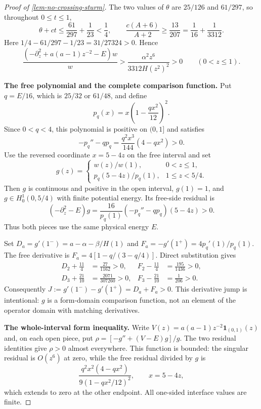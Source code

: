 \documentclass[11pt,a4paper]{article}
\theoremstyle{proofmanuscript}
\begin{document}
\begin{proof}[Proof of \ref{lem-no-crossing-sturm}]
The two values of \(\theta\) are \(25/126\) and \(61/297\), so throughout \(0\le t\le1\), \[
\theta+ct\le\frac{61}{297}+\frac1{23}<\frac14,
\qquad
\frac{c(A+6)}{A+2}\ge\frac{13}{207}
=\frac1{16}+\frac1{3312}.
\] Here \(1/4-61/297-1/23=31/27324>0\). Hence \[
\frac{(-\partial_z^2+a(a-1)z^{-2}-E)w}{w}
>\frac{\alpha^2z^6}{3312H(z^2)^2}>0
\qquad(0<z\le1).
\tag{H.6.5}
\]

\textbf{The free polynomial and the complete comparison function.} Put \(q=E/16\), which is \(25/32\) or \(61/48\), and define \[
p_q(x)=x\left(1-\frac{qx^2}{12}\right)^2.
\] Since \(0<q<4\), this polynomial is positive on \((0,1]\) and satisfies \[
-p_q''-q p_q=\frac{q^2x^3}{144}(4-qx^2)>0.
\tag{H.6.6}
\] Use the reversed coordinate \(x=5-4z\) on the free interval and set \[
g(z)=
\begin{cases}
w(z)/w(1),&0<z\le1,\\[2mm]
p_q(5-4z)/p_q(1),&1\le z<5/4.
\end{cases}
\tag{H.6.7}
\] Then \(g\) is continuous and positive in the open interval, \(g(1)=1\), and \(g\in H_0^1(0,5/4)\) with finite potential energy. Its free-side residual is \[
(-\partial_z^2-E)g
=\frac{16}{p_q(1)}(-p_q''-q p_q)(5-4z)>0.
\] Thus both pieces use the same physical energy \(E\).

Set \(D_a=g'(1^-)=a-\alpha-\beta/H(1)\) and \(F_a=-g'(1^+)=4p_q'(1)/p_q(1)\). The free derivative is \(F_a=4[1-q/(3-q/4)]\). Direct substitution gives \[
\begin{aligned}
D_2+\frac{11}{4}&=\frac{27}{1162}>0,
&F_2-\frac{11}{4}&=\frac{195}{1436}>0,\\
D_3+\frac{21}{10}&=\frac{2071}{307260}>0,
&F_3-\frac{21}{10}&=\frac1{206}>0.
\end{aligned}
\tag{H.6.8}
\] Consequently \(J:=g'(1^-)-g'(1^+)=D_a+F_a>0\). This derivative jump is intentional: \(g\) is a form-domain comparison function, not an element of the operator domain with matching derivatives.

\textbf{The whole-interval form inequality.} Write \(V(z)=a(a-1)z^{-2}\mathbf1_{(0,1)}(z)\) and, on each open piece, put \(\rho=[-g''+(V-E)g]/g\). The two residual identities give \(\rho>0\) almost everywhere. This function is bounded: the singular residual is \(O(z^6)\) at zero, while the free residual divided by \(g\) is \[
\frac{q^2x^2(4-qx^2)}{9(1-qx^2/12)^2},\qquad x=5-4z,
\] which extends to zero at the other endpoint. All one-sided interface values are finite.


\end{proof}
\end{document}
